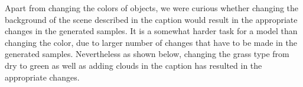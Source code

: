 \documentclass{article} %
\begin{document}
\vspace{-0.3cm}
\begin{figure}[h]
\captionsetup[subfigure]{labelformat=empty}
\begin{center}
\quad
%
\quad
%
\quad
%
\quad
%
\end{center}
\label{fig:label}
\vspace{-0.2cm}
\end{figure}

Apart from changing the colors of objects, we were curious whether changing the background of the scene described in the caption would result in the appropriate changes in the generated samples. It is a somewhat harder task for a model than changing the color, due to larger number of changes that have to be made in the generated samples. Nevertheless as shown below, changing the grass type from dry to green as well as adding clouds in the caption has resulted in the appropriate changes.
\end{document}
